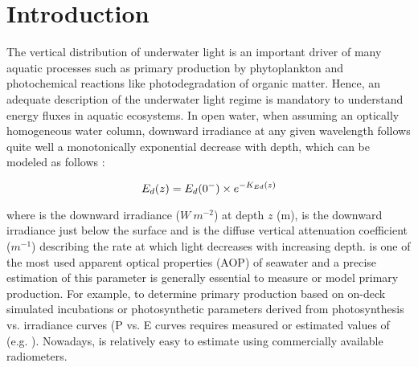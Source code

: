 \section{Introduction}

The vertical distribution of underwater light is an important driver of many aquatic processes such as primary production by phytoplankton and photochemical reactions like photodegradation of organic matter. Hence, an adequate description of the underwater light regime is mandatory to understand energy fluxes in aquatic ecosystems. In open water, when assuming an optically homogeneous water column, downward irradiance at any given wavelength follows quite well a monotonically exponential decrease with depth, which can be modeled as follows \citep{Kirk1994}:

\begin{equation}
    {E_d(z)}{} = {E_d(0^-)}{} \times e^{-K_{Ed}(z)}
    \label{eq:edz}
\end{equation}

where \edz{} is the downward irradiance ($W~m^{-2}$) at depth $z$ (m), \edzero{} is the downward irradiance just below the surface and \ked{} is the diffuse vertical attenuation coefficient ($m^{-1}$) describing the rate at which light decreases with increasing depth. \ked{} is one of the most used apparent optical properties (AOP) of seawater and a precise estimation of this parameter is generally essential to measure or model primary production. For example, to determine primary production based on on-deck simulated incubations or photosynthetic parameters derived from photosynthesis vs. irradiance curves (P vs. E curves requires measured or estimated values of \ked{} (e.g. \citet{Morel1996}). Nowadays, \ked{} is relatively easy to estimate using commercially available radiometers. 

